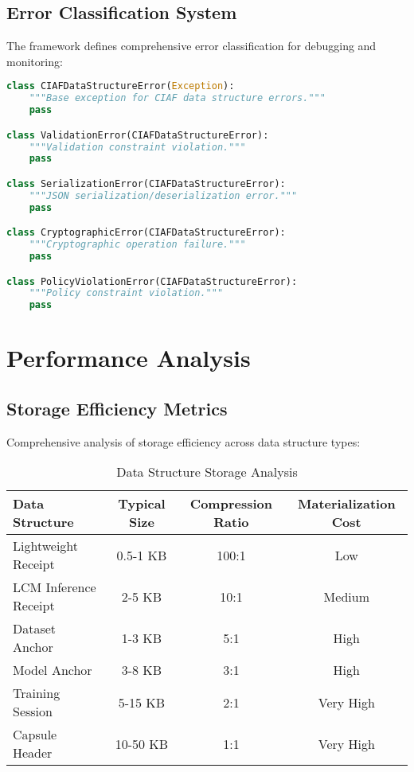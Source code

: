 \documentclass[12pt,a4paper]{article}
\begin{document}
\subsection{Error Classification System}

The framework defines comprehensive error classification for debugging and monitoring:

\begin{lstlisting}[language=Python, caption=Error Classification System]
class CIAFDataStructureError(Exception):
    """Base exception for CIAF data structure errors."""
    pass

class ValidationError(CIAFDataStructureError):
    """Validation constraint violation."""
    pass

class SerializationError(CIAFDataStructureError):
    """JSON serialization/deserialization error."""
    pass

class CryptographicError(CIAFDataStructureError):
    """Cryptographic operation failure."""
    pass

class PolicyViolationError(CIAFDataStructureError):
    """Policy constraint violation."""
    pass
\end{lstlisting}

\section{Performance Analysis}

\subsection{Storage Efficiency Metrics}

Comprehensive analysis of storage efficiency across data structure types:

\begin{table}[H]
\centering
\caption{Data Structure Storage Analysis}
\begin{tabular}{@{}lccc@{}}
\toprule
\textbf{Data Structure} & \textbf{Typical Size} & \textbf{Compression Ratio} & \textbf{Materialization Cost} \\
\midrule
Lightweight Receipt & 0.5-1 KB & 100:1 & Low \\
LCM Inference Receipt & 2-5 KB & 10:1 & Medium \\
Dataset Anchor & 1-3 KB & 5:1 & High \\
Model Anchor & 3-8 KB & 3:1 & High \\
Training Session & 5-15 KB & 2:1 & Very High \\
Capsule Header & 10-50 KB & 1:1 & Very High \\
\bottomrule
\end{tabular}
\label{tab:storage}
\end{table}
\end{document}
